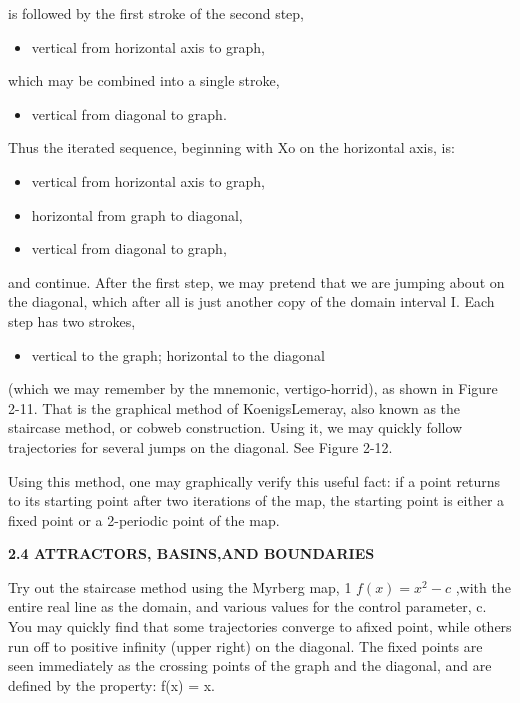 \documentclass[12pt]{article}
\begin{document}
is followed by the first stroke of the second step,

\begin{itemize}
\item vertical from horizontal axis to graph,
\end{itemize}

which may be combined into a single stroke,

\begin{itemize}
\item vertical from diagonal to graph.
\end{itemize}

Thus the iterated sequence, beginning with Xo on the horizontal
axis, is:

\begin{itemize}
\item vertical from horizontal axis to graph,
\item horizontal from graph to diagonal,
\item vertical from diagonal to graph,
\end{itemize}

and continue. After the first step, we may pretend that we are jumping
about on the diagonal, which after all is just another copy of the
domain interval I. Each step has two strokes,

\begin{itemize}
\item vertical to the graph; horizontal to the diagonal
\end{itemize}

(which we may remember by the mnemonic, vertigo-horrid), as
shown in Figure 2-11. That is the graphical method of KoenigsLemeray,
also known as the staircase method, or cobweb construction.
Using it, we may quickly follow trajectories for several jumps
on the diagonal. See Figure 2-12.

\hfill

Using this method, one may graphically verify this useful fact:
if a point returns to its starting point after two iterations of the map,
the starting point is either a fixed point or a 2-periodic point of the
map.

\hfill

\textbf{2.4 ATTRACTORS, BASINS,AND BOUNDARIES}

\hfill

Try out the staircase method using the Myrberg map, 1
$f(x) = x^2 -c$ ,with the entire real line as the domain, and various
values for the control parameter, c. You may quickly find that some
trajectories converge to afixed point, while others run off to positive
infinity (upper right) on the diagonal. The fixed points are seen
immediately as the crossing points of the graph and the diagonal,
and are defined by the property: f(x) = x.
\end{document}
